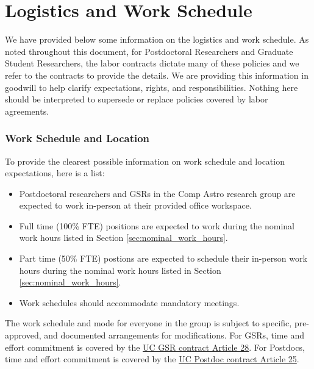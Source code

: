\section{Logistics and Work Schedule}
\label{sec:logistics}

We have provided below some information on the logistics and work schedule. As noted throughout this document, for Postdoctoral Researchers and Graduate Student Researchers, the labor contracts dictate many of these policies and we refer to the contracts to provide the details. We are providing this information in goodwill to help
clarify expectations, rights, and responsibilities. Nothing here should be interpreted to supersede or replace
policies covered by labor agreements.


\subsubsection{Work Schedule and Location}

To provide the clearest possible information on work schedule and location expectations, here is a list:

\begin{itemize}
	\item Postdoctoral researchers and GSRs in the Comp Astro research group are expected to work in-person at their provided office workspace.
	\item Full time (100\% FTE) positions are expected to work during the nominal work hours listed in Section \ref{sec:nominal_work_hours}.
	\item Part time (50\% FTE) postions are expected to schedule their in-person work hours during the nominal work hours listed in Section \ref{sec:nominal_work_hours}.
	\item Work schedules should accommodate mandatory meetings.
\end{itemize}

\noindent
The work schedule and mode for everyone in the group is subject to specific, pre-approved, and documented arrangements for modifications. For GSRs, time and effort commitment is covered by the \href{https://qa.ucnet.universityofcalifornia.edu/labor/bargaining-units/br/docs/br_28_time-and-effort-commitment_2022-2025.pdf}{UC GSR contract Article 28}. For Postdocs, time
and effort commitment is covered by the \href{https://ucnet.universityofcalifornia.edu/wp-content/uploads/labor/bargaining-units/px/docs/px_tentative_agremeents_effective_12-09-2022.pdf}{UC Postdoc contract Article 25}.\\


